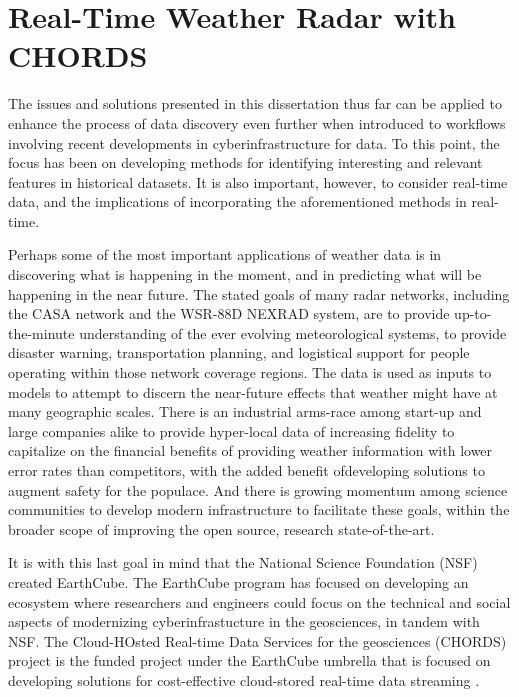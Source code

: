 \chapter{Real-Time Weather Radar with CHORDS}
\label{sec:realtime}
The issues and solutions presented in this dissertation thus far can be applied to enhance the process of data discovery even further when introduced to workflows involving recent developments in cyberinfrastructure for data. 
To this point, the focus has been on developing methods for identifying interesting and relevant features in historical datasets. 
It is also important, however, to consider real-time data, and the implications of incorporating the aforementioned methods in real-time.

Perhaps some of the most important applications of weather data is in discovering what is happening in the moment, and in predicting what will be happening in the near future. 
The stated goals of many radar networks, including the CASA network and the WSR-88D NEXRAD system, are to provide up-to-the-minute understanding of the ever evolving meteorological systems, to provide disaster warning, transportation planning, and logistical support for people operating within those network coverage regions. 
The data is used as inputs to models to attempt to discern the near-future effects that weather might have at many geographic scales. 
There is an industrial arms-race among start-up and large companies alike to provide hyper-local data of increasing fidelity to capitalize on the financial benefits of providing weather information with lower error rates than competitors, with the added benefit ofdeveloping solutions to augment safety for the populace. 
And there is growing momentum among science communities to develop modern infrastructure to facilitate these goals, within the broader scope of improving the open source, research state-of-the-art.

It is with this last goal in mind that the National Science Foundation (NSF) created EarthCube. 
The EarthCube program has focused on developing an ecosystem where researchers and engineers could focus on the technical and social aspects of modernizing cyberinfrastucture in the geosciences, in tandem with NSF.
The Cloud-HOsted Real-time Data Services for the geosciences (CHORDS) project is the funded project under the EarthCube umbrella that is focused on developing solutions for cost-effective cloud-stored real-time data streaming \cite{kerkez2016cloud}.

